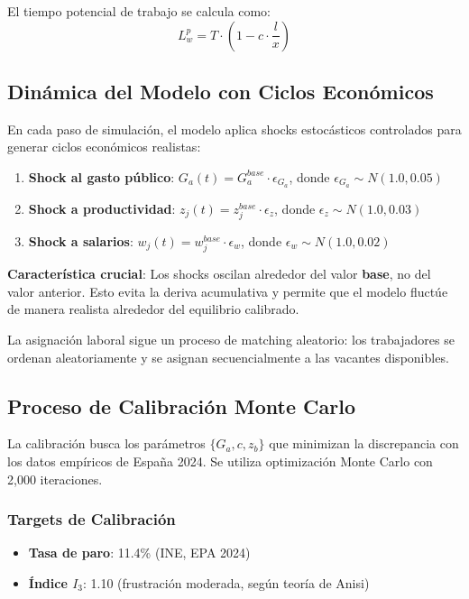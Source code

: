 El tiempo potencial de trabajo se calcula como:
\begin{equation}
L_w^p = T \cdot \left(1 - c \cdot \frac{l}{x}\right)
\end{equation}

\subsection{Dinámica del Modelo con Ciclos Económicos}

En cada paso de simulación, el modelo aplica shocks estocásticos controlados para generar ciclos económicos realistas:

\begin{enumerate}
    \item \textbf{Shock al gasto público}: $G_a(t) = G_a^{base} \cdot \epsilon_{G_a}$, donde $\epsilon_{G_a} \sim N(1.0, 0.05)$
    \item \textbf{Shock a productividad}: $z_j(t) = z_j^{base} \cdot \epsilon_z$, donde $\epsilon_z \sim N(1.0, 0.03)$
    \item \textbf{Shock a salarios}: $w_j(t) = w_j^{base} \cdot \epsilon_w$, donde $\epsilon_w \sim N(1.0, 0.02)$
\end{enumerate}

\textbf{Característica crucial}: Los shocks oscilan alrededor del valor \textbf{base}, no del valor anterior. Esto evita la deriva acumulativa y permite que el modelo fluctúe de manera realista alrededor del equilibrio calibrado.

La asignación laboral sigue un proceso de matching aleatorio: los trabajadores se ordenan aleatoriamente y se asignan secuencialmente a las vacantes disponibles.

\subsection{Proceso de Calibración Monte Carlo}

La calibración busca los parámetros $\{G_a, c, z_b\}$ que minimizan la discrepancia con los datos empíricos de España 2024. Se utiliza optimización Monte Carlo con 2,000 iteraciones.

\subsubsection{Targets de Calibración}

\begin{itemize}
    \item \textbf{Tasa de paro}: 11.4\% (INE, EPA 2024) \cite{ineEPA2024}
    \item \textbf{Índice $I_3$}: 1.10 (frustración moderada, según teoría de Anisi)
\end{itemize}

